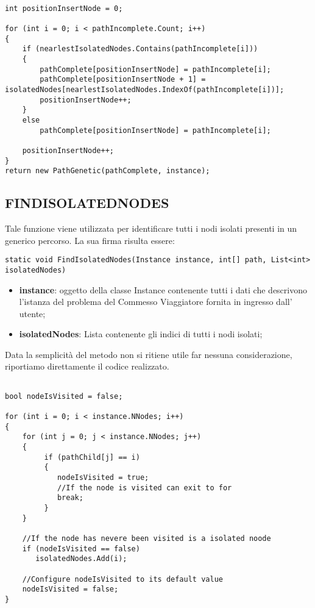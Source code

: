 \documentclass[11pt]{article}
\begin{document}
\begin{lstlisting}

int positionInsertNode = 0;

for (int i = 0; i < pathIncomplete.Count; i++)
{
    if (nearlestIsolatedNodes.Contains(pathIncomplete[i]))
    {
        pathComplete[positionInsertNode] = pathIncomplete[i];
        pathComplete[positionInsertNode + 1] = isolatedNodes[nearlestIsolatedNodes.IndexOf(pathIncomplete[i])];
        positionInsertNode++;
    }
    else
        pathComplete[positionInsertNode] = pathIncomplete[i];

    positionInsertNode++;
}
return new PathGenetic(pathComplete, instance);
\end{lstlisting}

\subsection*{FINDISOLATEDNODES}
\label{sec:FindIsolatedNodesS}

Tale funzione viene utilizzata per identificare tutti i nodi isolati presenti in un generico percorso.
La sua firma risulta essere:

\begin{lstlisting}
static void FindIsolatedNodes(Instance instance, int[] path, List<int> isolatedNodes)
\end{lstlisting}

\begin{itemize}
    \item \textbf{instance}: oggetto della classe Instance contenente tutti i dati che descrivono l'istanza del problema del Commesso Viaggiatore fornita in ingresso dall' utente;
    \item \textbf{isolatedNodes}: Lista contenente gli indici di tutti i nodi isolati;
\end{itemize}

Data la semplicità del metodo non si ritiene utile far nessuna considerazione, riportiamo direttamente il codice realizzato.

\begin{lstlisting}

bool nodeIsVisited = false;

for (int i = 0; i < instance.NNodes; i++)
{
    for (int j = 0; j < instance.NNodes; j++)
    {
         if (pathChild[j] == i)
         {
            nodeIsVisited = true;
            //If the node is visited can exit to for
            break;
         }
    }

    //If the node has nevere been visited is a isolated noode
    if (nodeIsVisited == false)
       isolatedNodes.Add(i);

    //Configure nodeIsVisited to its default value
    nodeIsVisited = false;
}

\end{lstlisting}
\end{document}
